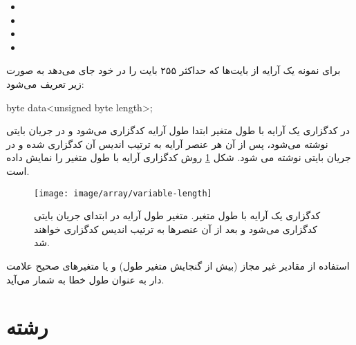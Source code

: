 \begin{itemize}
  \item {}
  \item {}
  \item {}
  \item {}
\end{itemize}

برای نمونه یک آرایه از بایت‌ها که حداکثر ۲۵۵ بایت را در خود جای می‌دهد به صورت
زیر تعریف می‌شود:

\begin{C++}
byte data<unsigned byte length>;
\end{C++}

در کدگزاری یک آرایه با طول متغیر ابتدا طول آرایه کدگزاری می‌شود و در جریان بایتی
نوشته می‌شود، پس از آن هر عنصر آرایه به ترتیب اندیس آن کدگزاری شده و در جریان
بایتی نوشته می شود.
شکل \ref{image/array/variable-length} روش کدگزاری آرایه با طول متغیر را نمایش
داده است.


\begin{figure}
\centering
\texttt{[image: image/array/variable-length]}
\caption[کدگذاری یک آرایه با طول متغیر]{
	کدگزاری یک آرایه با طول متغیر. متغیر طول آرایه در ابتدای جریان بایتی کدگزاری
	می‌شود و بعد از آن عنصرها به ترتیب اندیس کدگزاری خواهند شد.
}
\label{image/array/variable-length}
\end{figure}

\begin{warning}
استفاده از مقادیر غیر مجاز (بیش از گنجایش متغیر طول) و یا متغیرهای صحیح علامت
دار به عنوان طول خطا به شمار می‌آید.
\end{warning}


\section{رشته}

